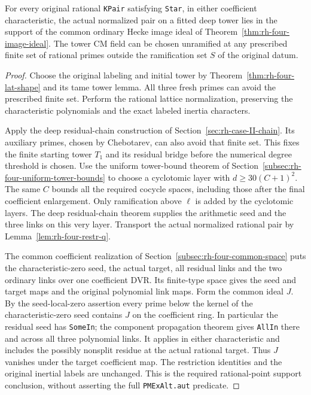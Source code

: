 \begin{theorem}
\label{thm:rh-four-rational-support}
For every original rational \texttt{KPair} satisfying
\texttt{Star}, in either coefficient characteristic,
the actual normalized pair on a fitted deep tower
lies in the support of the common ordinary Hecke
image ideal of Theorem~\ref{thm:rh-four-image-ideal}.
The tower CM field can be chosen unramified at any
prescribed finite set of rational primes outside the
ramification set $S$ of the original datum.
\end{theorem}

\begin{proof}
Choose the original labeling and initial tower by
Theorem~\ref{thm:rh-four-lat-shape} and its tame
tower lemma. All three fresh primes can avoid
the prescribed finite set. Perform the rational
lattice normalization, preserving the characteristic
polynomials and the exact labeled inertia characters.

Apply the deep residual-chain construction of
Section~\ref{sec:rh-case-II-chain}. Its auxiliary
primes, chosen by Chebotarev, can also avoid that
finite set. This fixes the finite starting tower
$T_1$ and its residual bridge before the numerical
degree threshold is chosen. Use the uniform
tower-bound theorem of Section~\ref{subsec:rh-four-uniform-tower-bounds}
to choose a cyclotomic layer with
$d\ge30(C+1)^2$. The same $C$ bounds all the
required cocycle spaces, including those after
the final coefficient enlargement. Only ramification
above $\ell$ is added by the cyclotomic layers.
The deep residual-chain theorem supplies the
arithmetic seed and the three links on this very
layer. Transport the actual normalized rational
pair by Lemma~\ref{lem:rh-four-restr-q}.

The common coefficient realization of
Section~\ref{subsec:rh-four-common-space} puts the
characteristic-zero seed, the actual target,
all residual links and the two ordinary links
over one coefficient DVR. Its finite-type space
gives the seed and target maps and the original
polynomial link maps. Form the common ideal $J$.
By the seed-local-zero assertion every prime below
the kernel of the characteristic-zero seed contains
$J$ on the coefficient ring. In particular the
residual seed has \texttt{SomeIn}; the component
propagation theorem gives \texttt{AllIn} there
and across all three polynomial links. It applies
in either characteristic and includes the possibly
nonsplit residue at the actual rational target.
Thus $J$ vanishes under the target coefficient
map. The restriction identities and the original
inertial labels are unchanged. This is the required
rational-point support conclusion, without asserting
the full \texttt{PMExAlt.aut} predicate.
\end{proof}

